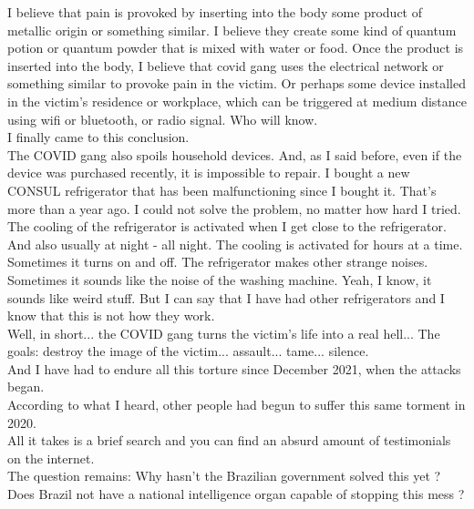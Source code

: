 \documentclass[11pt]{book}
\begin{document}
\noindent I believe that pain is provoked by inserting into the body some product of metallic origin or something similar. I believe they create some kind of quantum potion or quantum powder that is mixed with water or food. Once the product is inserted into the body, I believe that covid gang uses the electrical network or something similar to provoke pain in the victim. Or perhaps some device installed in the victim's residence or workplace, which can be triggered at medium distance using wifi or bluetooth, or radio signal. Who will know. \\

\noindent I finally came to this conclusion. \\

\noindent The COVID gang also spoils household devices. And, as I said before, even if the device was purchased recently, it is impossible to repair. I bought a new CONSUL refrigerator that has been malfunctioning since I bought it. That's more than a year ago. I could not solve the problem, no matter how hard I tried. The cooling of the refrigerator is activated when I get close to the refrigerator. And also usually at night - all night. The cooling is activated for hours at a time. Sometimes it turns on and off. The refrigerator makes other strange noises. Sometimes it sounds like the noise of the washing machine. Yeah, I know, it sounds like weird stuff. But I can say that I have had other refrigerators and I know that this is not how they work. \\

\noindent Well, in short... the COVID gang turns the victim's life into a real hell... The goals: destroy the image of the victim... assault... tame... silence. \\

\noindent And I have had to endure all this torture since December 2021, when the attacks began. \\

\noindent According to what I heard, other people had begun to suffer this same torment in 2020. \\

\noindent All it takes is a brief search and you can find an absurd amount of testimonials on the internet. \\

\noindent The question remains: Why hasn't the Brazilian government solved this yet ? \\

\noindent Does Brazil not have a national intelligence organ capable of stopping this mess ?
\end{document}

